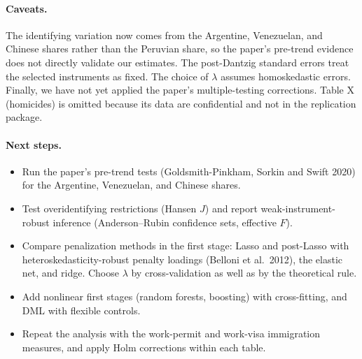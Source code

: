 \documentclass[11pt]{article}
\begin{document}
\paragraph{Caveats.} The identifying variation now comes from the Argentine, Venezuelan,
and Chinese shares rather than the Peruvian share, so the paper's pre-trend evidence does
not directly validate our estimates. The post-Dantzig standard errors treat the selected
instruments as fixed. The choice of $\lambda$ assumes homoskedastic errors. Finally, we
have not yet applied the paper's multiple-testing corrections. Table X (homicides) is
omitted because its data are confidential and not in the replication package.

\paragraph{Next steps.}
\begin{itemize}
  \item Run the paper's pre-trend tests (Goldsmith-Pinkham, Sorkin and Swift 2020) for the
        Argentine, Venezuelan, and Chinese shares.
  \item Test overidentifying restrictions (Hansen $J$) and report weak-instrument-robust
        inference (Anderson--Rubin confidence sets, effective $F$).
  \item Compare penalization methods in the first stage: Lasso and post-Lasso with
        heteroskedasticity-robust penalty loadings (Belloni et al.\ 2012), the elastic net,
        and ridge. Choose $\lambda$ by cross-validation as well as by the theoretical rule.
  \item Add nonlinear first stages (random forests, boosting) with cross-fitting, and DML
        with flexible controls.
  \item Repeat the analysis with the work-permit and work-visa immigration measures, and
        apply Holm corrections within each table.
\end{itemize}
\end{document}

